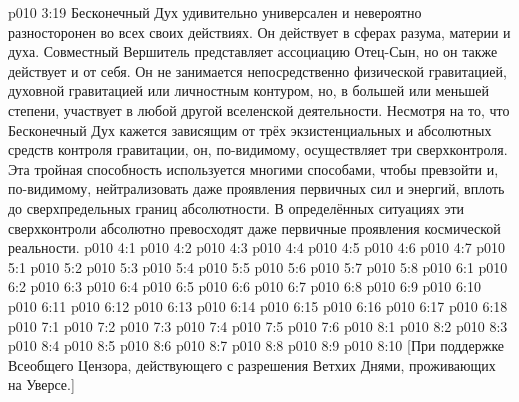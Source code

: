 \vs p010 3:19 \pc Бесконечный Дух удивительно универсален и невероятно разносторонен во всех своих действиях. Он действует в сферах разума, материи и духа. Совместный Вершитель представляет ассоциацию Отец\hyp{}Сын, но он также действует и от себя. Он не занимается непосредственно физической гравитацией, духовной гравитацией или личностным контуром, но, в большей или меньшей степени, участвует в любой другой вселенской деятельности. Несмотря на то, что Бесконечный Дух кажется зависящим от трёх экзистенциальных и абсолютных средств контроля гравитации, он, по\hyp{}видимому, осуществляет три сверхконтроля. Эта тройная способность используется многими способами, чтобы превзойти и, по\hyp{}видимому, нейтрализовать даже проявления первичных сил и энергий, вплоть до сверхпредельных границ абсолютности. В определённых ситуациях эти сверхконтроли абсолютно превосходят даже первичные проявления космической реальности.
\vs p010 4:1 
\vs p010 4:2 \pc 
\vs p010 4:3 
\vs p010 4:4 
\vs p010 4:5 \pc 
\vs p010 4:6 \pc 
\vs p010 4:7 
\vs p010 5:1 
\vs p010 5:2 
\vs p010 5:3 \pc 
\vs p010 5:4 
\vs p010 5:5 
\vs p010 5:6 
\vs p010 5:7 \pc 
\vs p010 5:8 \pc 
{}
\vs p010 6:1 
\vs p010 6:2 \pc 
\vs p010 6:3 \pc 
\vs p010 6:4 \pc 
\vs p010 6:5 \pc 
\vs p010 6:6 
\vs p010 6:7 
\vs p010 6:8 
\vs p010 6:9 
\vs p010 6:10 
\vs p010 6:11 
\vs p010 6:12 
\vs p010 6:13 
\vs p010 6:14 
\vs p010 6:15 
\vs p010 6:16 \pc 
\vs p010 6:17 
\vs p010 6:18 
\vs p010 7:1 
\vs p010 7:2 \pc 
\vs p010 7:3 
\vs p010 7:4 \pc 
\vs p010 7:5 
\vs p010 7:6 
\vs p010 8:1 
\vs p010 8:2 
\vs p010 8:3 \pc 
\vs p010 8:4 
\vs p010 8:5 
\vs p010 8:6 \pc 
\vs p010 8:7 
\vs p010 8:8 
\vs p010 8:9 \pc 
\vsetoff
\vs p010 8:10 [При поддержке Всеобщего Цензора, действующего с разрешения Ветхих Днями, проживающих на Уверсе.]
\quizlink
